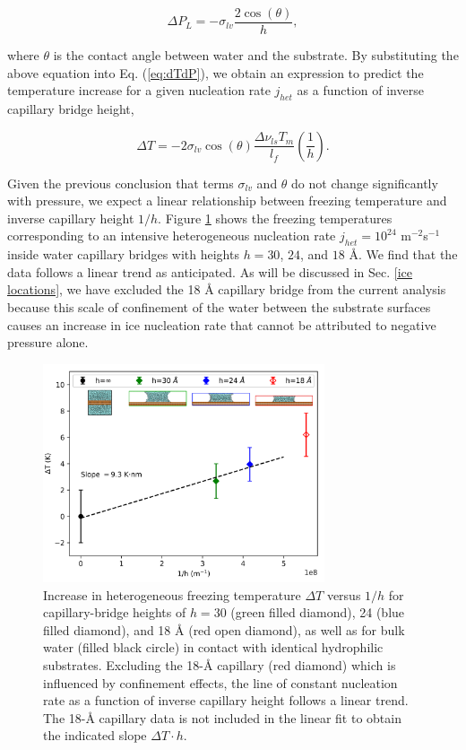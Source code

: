 \documentclass[journal abbreviation, manuscript]{copernicus}
\begin{document}
\begin{equation} \label{eq:dPh}
   \Delta P_{L} = -\sigma_{lv} \frac{2\cos(\theta)}{h},
\end{equation}

\noindent where $\theta$ is the contact angle between water and the substrate. By substituting the above equation into Eq. (\ref{eq:dTdP}), we obtain an expression to predict the temperature increase for a given nucleation rate $j_{het}$ as a function of inverse capillary bridge height,  

\begin{equation}\label{eq:dTh}
     \Delta T = -2 \sigma_{lv}\cos(\theta) \frac{\Delta \nu_{ls} T_m }{l_f} \left(\frac{1}{h}\right).
\end{equation}

\noindent Given the previous conclusion that terms $\sigma_{lv}$ and $\theta$ do not change significantly with pressure, we expect a linear relationship between freezing temperature and inverse capillary height $1/h$. Figure \ref{fig:capillary} shows the freezing temperatures corresponding to an intensive heterogeneous nucleation rate $j_{het} = 10^{24}$ m$^{-2}$s$^{-1}$ inside water capillary bridges with heights $h = 30$, $24$, and $18$ \AA{}. We find that the data follows a linear trend as anticipated. As will be discussed in Sec. \ref{ice locations}, we have excluded the 18 \AA{} capillary bridge from the current analysis because this scale of confinement of the water between the substrate surfaces causes an increase in ice nucleation rate that cannot be attributed to negative pressure alone.

\begin{figure}[t]
\includegraphics[width=8.3cm]{figures/TvH_inset.png}
\caption{Increase in heterogeneous freezing temperature $\Delta T$ versus $1/h$ for capillary-bridge heights of $h = 30$ (green filled diamond), 24 (blue filled diamond), and 18 \AA{} (red open diamond), as well as for bulk water (filled black circle) in contact with identical hydrophilic substrates. Excluding the 18-\AA{} capillary (red diamond) which is influenced by confinement effects, the line of constant nucleation rate as a function of inverse capillary height follows a linear trend. The 18-\AA{} capillary data is not included in the linear fit to obtain the indicated slope $\Delta T \cdot h$.}
    \label{fig:capillary}
\end{figure}
\end{document}
